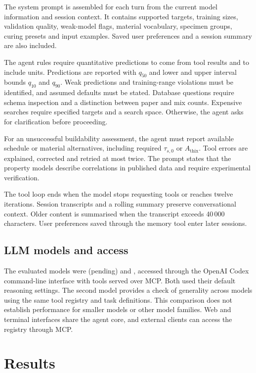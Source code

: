 \documentclass[preprint,12pt]{elsarticle}
\providecommand{\nbenchCxModel}{(pending)}
\begin{document}
The system prompt is assembled for each turn from the current model information and session context. It contains supported targets, training sizes, validation quality, weak-model flags, material vocabulary, specimen groups, curing presets and input examples. Saved user preferences and a session summary are also included.

The agent rules require quantitative predictions to come from tool results and to include units. Predictions are reported with $q_{50}$ and lower and upper interval bounds $q_{10}$ and $q_{90}$. Weak predictions and training-range violations must be identified, and assumed defaults must be stated. Database questions require schema inspection and a distinction between paper and mix counts. Expensive searches require specified targets and a search space. Otherwise, the agent asks for clarification before proceeding.

For an unsuccessful buildability assessment, the agent must report available schedule or material alternatives, including required $\tau_{s,0}$ or $A_{\mathrm{thix}}$. Tool errors are explained, corrected and retried at most twice. The prompt states that the property models describe correlations in published data and require experimental verification.

The tool loop ends when the model stops requesting tools or reaches twelve iterations. Session transcripts and a rolling summary preserve conversational context. Older content is summarised when the transcript exceeds 40\,000 characters. User preferences saved through the memory tool enter later sessions.

\subsection{LLM models and access}

The evaluated models were \nbenchCxModel{} and \nbenchCsModel{}, accessed through the OpenAI Codex command-line interface with tools served over MCP. Both used their default reasoning settings. The second model provides a check of generality across models using the same tool registry and task definitions. This comparison does not establish performance for smaller models or other model families. Web and terminal interfaces share the agent core, and external clients can access the registry through MCP.

\section{Results}\label{sec:results}
\end{document}
